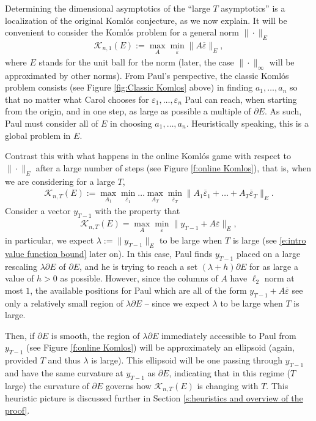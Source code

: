 \documentclass[reqno]{amsart}
\numberwithin{equation}{section}
\begin{document}
Determining the dimensional asymptotics of the ``large $T$ asymptotics'' is a localization of the original Koml\'os conjecture, as we now explain. It will be convenient to consider the Koml\'os problem for a general norm $\|\cdot\|_E$ 
\begin{align*}
  \mathcal{K}_{n,1}(E) := \max_{A}\min_{\overline \varepsilon}\|A\overline \varepsilon\|_E, 
\end{align*}
where $E$ stands for the unit ball for the norm (later, the case $\|\cdot\|_\infty$ will be approximated by other norms). From Paul's perspective, the classic Koml\'os problem consists (see Figure \ref{fig:Classic Komlos} above) in finding $a_1,\ldots,a_n$ so that no matter what Carol chooses for $\varepsilon_1,\ldots,\varepsilon_n$ Paul can reach, when starting from the origin, and in one step, as large as possible a multiple of $\partial E$. As such,  Paul must consider all of $E$ in choosing $a_1,\ldots,a_n$. Heuristically speaking, this is a global problem in $E$.

Contrast this with what happens in the online Koml\'os game with respect to $\|\cdot\|_E$ after a large number of steps (see  Figure \ref{f:online Komlos}), that is, when we are considering for a large $T$,
\begin{align*}
  \mathcal{K}_{n,T}(E) := \max_{A_1}\min_{\overline \varepsilon_1}\ldots\max_{A_T}\min_{\overline \varepsilon_T}\|A_1\overline \varepsilon_1+\ldots+A_T\overline \varepsilon_T\|_E.
\end{align*}
Consider a vector $y_{T-1}$ with the property that
\begin{align*}
  \mathcal{K}_{n,T}(E) = \max_{A}\min_{\overline \varepsilon}\|y_{T-1}+A\overline \varepsilon\|_E,
\end{align*}
in particular, we expect $\lambda := \|y_{T-1}\|_E$ to be large when $T$ is large (see \eqref{e:intro value function bound} later on). In this case, Paul finds $y_{T-1}$ placed on a large rescaling $\lambda \partial E$ of $\partial E$, and he is trying to reach a set $(\lambda+h) \partial E$ for as large a value of $h>0$ as possible. However, since the columns of $A$ have $\ell_2$ norm at most $1$,  the available positions for Paul which are all of the form $y_{T-1}+A\overline\varepsilon$ see only a relatively small region of $\lambda \partial E$ -- since we expect $\lambda$ to be large when $T$ is large. 

Then, if $\partial E$ is smooth, the region of $\lambda \partial E$ immediately accessible to Paul from $y_{T-1}$ (see Figure \ref{f:online Komlos}) will be approximately an ellipsoid (again, provided  $T$ and thus $\lambda$ is large).  This ellipsoid will be one passing through $y_{T-1}$ and have the same curvature at $y_{T-1}$ as $\partial E$, indicating that in this regime ($T$ large) the curvature of $\partial E$ governs how $\mathcal{K}_{n,T}(E)$ is changing with $T$. This heuristic picture is discussed further in Section \ref{s:heuristics and overview of the proof}.
\end{document}
